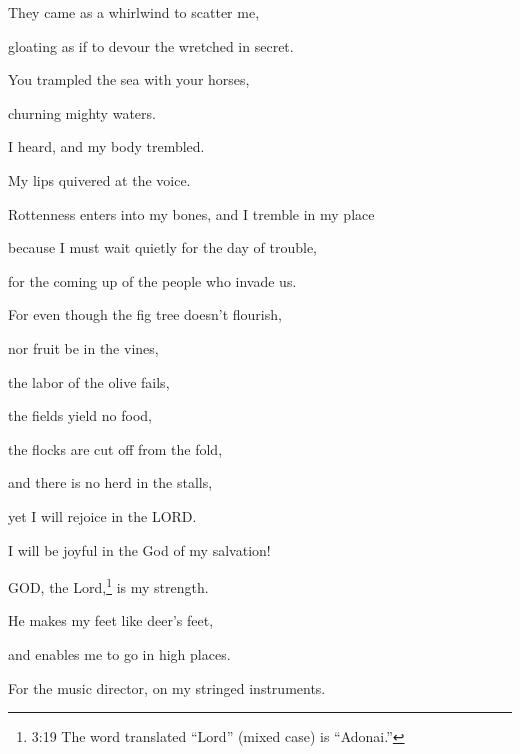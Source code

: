 They came as a whirlwind to scatter me,

gloating as if to devour the wretched in secret.


\myverse{}You trampled the sea with your horses,

churning mighty waters.


\myverse{}I heard, and my body trembled.

My lips quivered at the voice.

Rottenness enters into my bones, and I tremble in my place

because I must wait quietly for the day of trouble,

for the coming up of the people who invade us.


\myverse{}For even though the fig tree doesn’t flourish,

nor fruit be in the vines,

the labor of the olive fails,

the fields yield no food,

the flocks are cut off from the fold,

and there is no herd in the stalls,


\myverse{}yet I will rejoice in the LORD.

I will be joyful in the God of my salvation!


\myverse{}GOD, the Lord,\footnote{3:19 The word translated “Lord” (mixed case) is “Adonai.”} is my strength.

He makes my feet like deer’s feet,

and enables me to go in high places.

For the music director, on my stringed instruments.


